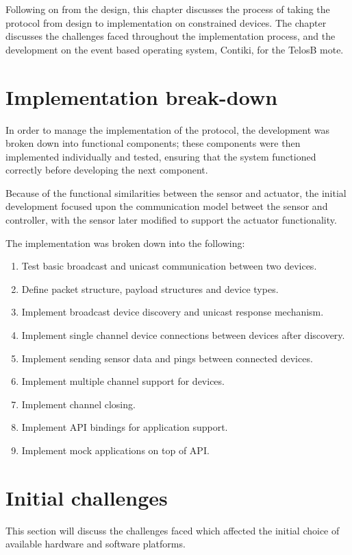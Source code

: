 Following on from the design, this chapter discusses the process of taking the protocol from design to implementation on constrained devices. The chapter discusses the challenges faced throughout the implementation process, and the development on the event based operating system, Contiki, for the TelosB mote. 


\section{Implementation break-down} %
\label{sec:implementation_break_down}
In order to manage the implementation of the protocol, the development was broken down into functional components; these components were then implemented individually and tested, ensuring that the system functioned correctly before developing the next component.

Because of the functional similarities between the sensor and actuator, the initial development focused upon the communication model betweet the sensor and controller, with the sensor later modified to support the actuator functionality.

The implementation was broken down into the following:
\vspace{-5mm} 
\begin{enumerate}
	\item Test basic broadcast and unicast communication between two devices.
	\item Define packet structure, payload structures and device types.
	\item Implement broadcast device discovery and unicast response mechanism.
	\item Implement single channel device connections between devices after discovery.
	\item Implement sending sensor data and pings between connected devices.
	\item Implement multiple channel support for devices.
	\item Implement channel closing.
	\item Implement API bindings for application support.
	\item Implement mock applications on top of API.
\end{enumerate}


\section{Initial challenges} %
\label{sec:initial_challenges}
This section will discuss the challenges faced which affected the initial choice of available hardware and software platforms.
